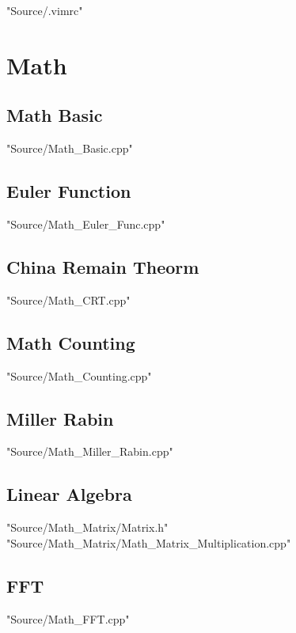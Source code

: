 \documentclass [12pt,twocolumn,oneside]{article}
\begin{document}
\pagestyle{fancy}
\fancyfoot{}
\fancyhead[R]{\thepage}
\setlength{\headheight}{15pt}
\renewcommand{\headrulewidth}{0.4pt}
\renewcommand{\contentsname}{Contents} 
\scriptsize
\tableofcontents

\bigskip
 {"Source/.vimrc"}




\newpage
\section{Math}
\subsection{Math Basic}
 {"Source/Math_Basic.cpp"}

\subsection{Euler Function}
 {"Source/Math_Euler_Func.cpp"}

\subsection{China Remain Theorm}
 {"Source/Math_CRT.cpp"}

\subsection{Math Counting}
 {"Source/Math_Counting.cpp"}

\subsection{Miller Rabin}
 {"Source/Math_Miller_Rabin.cpp"}

\subsection{Linear Algebra}
 {"Source/Math_Matrix/Matrix.h"}
 {"Source/Math_Matrix/Math_Matrix_Multiplication.cpp"}

\subsection{FFT}
 {"Source/Math_FFT.cpp"}
\end{document}
